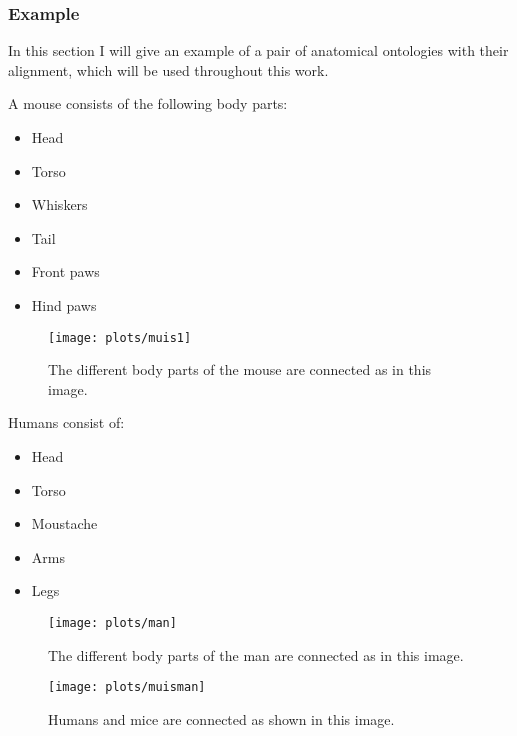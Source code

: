 \documentclass{article}
\begin{document}
 \subsubsection{Example} \label{example}
 In this section I will give an example of a pair of anatomical ontologies with their alignment, which will be used throughout this work.
 
\begin{minipage}{0.3\textwidth}
 A mouse consists of the following body parts:
 \begin{itemize}
 \item Head
 \item Torso
 \item Whiskers
 \item Tail
 \item Front paws
 \item Hind paws
 \end{itemize}
\end{minipage} \hfill
\begin{minipage}{0.65\textwidth}
 \begin{figure}[H]
 \texttt{[image: plots/muis1]}
 \label{mouse_example}
 \caption[Mouse ontology]{The different body parts of the mouse are connected as in this image.}
 \end{figure}
\end{minipage}

\begin{minipage}{0.3\textwidth}
 Humans consist of:
 \begin{itemize}
 \item Head
 \item Torso
 \item Moustache
 \item Arms
 \item Legs
 \end{itemize}
\end{minipage} \hfill
\begin{minipage}{0.7\textwidth}
 \begin{figure}[H]
 \texttt{[image: plots/man]}
 \label{man_example}
 \caption[Human ontology]{The different body parts of the man are connected as in this image.}
 \end{figure}
\end{minipage}
  
 
 \begin{figure}[H]
 \centering
 \texttt{[image: plots/muisman]}
 \label{muis_man_example}
 \caption[Aligned ontologies]{Humans and mice are connected as shown in this image.}
 \end{figure}
 
\end{document}
